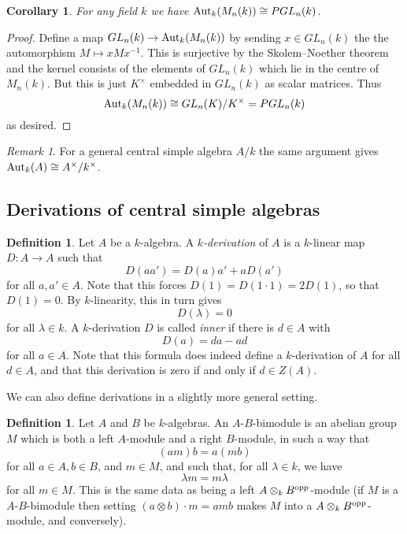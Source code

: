 \documentclass[11pt]{amsart}
\numberwithin{equation}{section}
\newtheorem{cor}[equation]{Corollary}
\theoremstyle{remark}
\newtheorem{remark}[equation]{Remark}
\theoremstyle{remark}
\theoremstyle{remark}
\theoremstyle{definition}
\theoremstyle{definition}
\theoremstyle{definition}
\newtheorem{defi}[equation]{Definition}
\theoremstyle{definition}
\theoremstyle{definition}
\theoremstyle{definition}
\begin{document}
\begin{cor} \label{pgl}
For any field $k$ we have $\textup{Aut}_k(M_n(k))\cong PGL_n(k)$.
\end{cor}

\begin{proof}
Define a map $GL_n(k)\rightarrow \textup{Aut}_k(M_n(k))$ by sending $x\in GL_n(k)$ the the automorphism $M\mapsto xMx^{-1}$. This is surjective by the Skolem--Noether theorem and the kernel consists of the elements of $GL_n(k)$ which lie in the centre of $M_n(k)$. But this is just $K^{\times}$ embedded in $GL_n(k)$ as scalar matrices. Thus 
\[\textup{Aut}_k(M_n(k))\cong GL_n(K)/K^{\times}=PGL_n(k)\]
as desired.
\end{proof}

\begin{remark}
For a general central simple algebra $A/k$ the same argument gives $\textup{Aut}_k(A)\cong A^{\times}/k^{\times}$. 
\end{remark}

\subsection{Derivations of central simple algebras}

\begin{defi}
Let $A$ be a $k$-algebra. A $k$\textit{-derivation} of $A$ is a $k$-linear map $D:A\rightarrow A$ such that
\[D(aa')=D(a)a'+aD(a')
\]
for all $a,a'\in A$.
Note that this forces $D(1)=D(1\cdot 1)=2D(1)$, so that $D(1)=0$. By $k$-linearity, this in turn gives \[D(\lambda)=0\]
for all $\lambda \in k$.
A $k$-derivation $D$ is called \textit{inner} if there is $d\in A$ with 
\[D(a)=da-ad\]
for all $a\in A$.
Note that this formula does indeed define a $k$-derivation of $A$ for all $d\in A$, and that this derivation is zero if and only if $d\in Z(A)$.
\end{defi}

We can also define derivations in a slightly more general setting. 

\begin{defi}
Let $A$ and $B$ be $k$-algebras. An $A$-$B$-bimodule is an abelian group $M$ which is both a left $A$-module and a right $B$-module, in such a way that 
\[(am)b=a(mb)\]
for all $a\in A, b\in B$, and $m\in M$, and such that, for all $\lambda \in k$, we have
\[\lambda m = m\lambda\]
for all $m\in M$. 
This is the same data as being a left $A\otimes_k B^\textup{opp}$-module (if $M$ is a $A$-$B$-bimodule then setting $(a\otimes b)\cdot m=amb$ makes $M$ into a $A\otimes_k B^\textup{opp}$-module, and conversely).
\end{defi}
\end{document}
